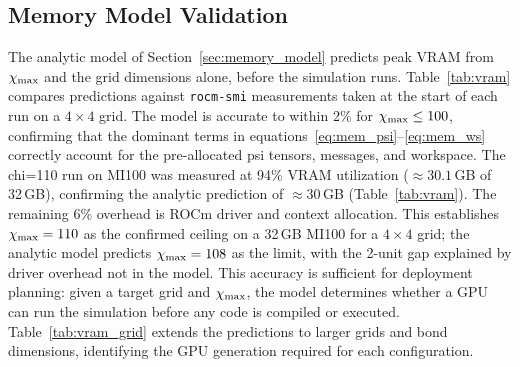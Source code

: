 \FloatBarrier
\subsection{Memory Model Validation}
\label{sec:memory_validation}

The analytic model of Section~\ref{sec:memory_model} predicts peak VRAM from
$\chi_{\mathrm{max}}$ and the grid dimensions alone, before the simulation runs.
Table~\ref{tab:vram} compares predictions against \texttt{rocm-smi} measurements
taken at the start of each run on a $4\times4$ grid.
The model is accurate to within 2\% for $\chi_{\mathrm{max}} \leq 100$, confirming that
the dominant terms in equations~\eqref{eq:mem_psi}--\eqref{eq:mem_ws} correctly
account for the pre-allocated psi tensors, messages, and workspace.
The chi=110 run on MI100 was measured at 94\% VRAM utilization
($\approx 30.1$\,GB of 32\,GB), confirming the analytic prediction
of $\approx 30$\,GB (Table~\ref{tab:vram}).
The remaining 6\% overhead is ROCm driver and context allocation.
This establishes $\chi_{\mathrm{max}} = 110$ as the confirmed ceiling on a 32\,GB MI100
for a $4\times4$ grid; the analytic model predicts $\chi_{\mathrm{max}} = 108$ as the
limit, with the 2-unit gap explained by driver overhead not in the model.
This accuracy is sufficient for deployment planning: given a target grid and
$\chi_{\mathrm{max}}$, the model determines whether a GPU can run the simulation before any
code is compiled or executed.
Table~\ref{tab:vram_grid} extends the predictions to larger grids and bond
dimensions, identifying the GPU generation required for each configuration.

